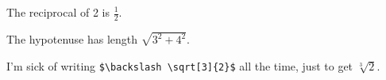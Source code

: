 \documentclass[11pt]{article}
\newcommand{\reci}[1]{\frac{1}{#1}}
\newcommand{\hypot}[2]{\sqrt{#1^2+#2^2}}
\newcommand{\cbrt}[1]{\sqrt[3]{#1}}
\begin{document}
The reciprocal of 2 is $\reci{2}$.

The hypotenuse has length $\hypot{3}{4}$.

I'm sick of writing \verb|$\backslash \sqrt[3]{2}$| all the time, just to get $\cbrt{2}$.
\end{document}
